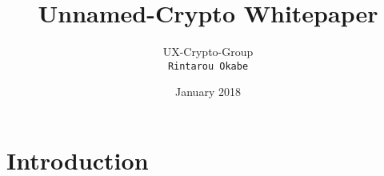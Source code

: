 \documentclass{article}
\title{Unnamed-Crypto Whitepaper}
\author{
UX-Crypto-Group\\
{\tt\small Rintarou Okabe}\\
}
\date{January 2018}
\begin{document}
\maketitle


\section{Introduction}
\end{document}
